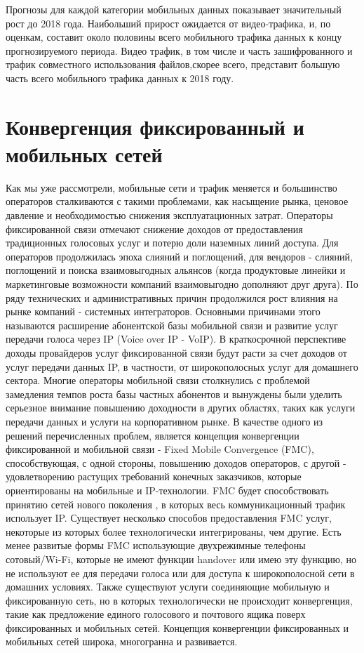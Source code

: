 Прогнозы для каждой категории мобильных данных показывает значительный рост до 2018 года. Наибольший прирост ожидается от видео-трафика, и, по оценкам, составит около половины всего мобильного трафика данных к концу прогнозируемого периода. Видео трафик, в том числе и часть зашифрованного и трафик совместного использования файлов,скорее всего, представит большую часть всего мобильного трафика данных к 2018 году.









\section{Конвергенция фиксированный и мобильных сетей} \label{sect1_1}
Как мы уже рассмотрели, мобильные сети и трафик меняется и большинство операторов сталкиваются с такими проблемами, как насыщение рынка, ценовое давление и необходимостью снижения эксплуатационных затрат. Операторы фиксированной связи отмечают снижение доходов от предоставления традиционных голосовых услуг и потерю доли наземных линий доступа. Для операторов продолжилась эпоха слияний и поглощений, для вендоров - слияний, поглощений и поиска взаимовыгодных альянсов (когда продуктовые линейки и маркетинговые возможности компаний взаимовыгодно дополняют друг друга). По ряду технических и административных причин продолжился рост влияния на рынке компаний - системных интеграторов. Основными причинами этого называются расширение абонентской базы мобильной связи и развитие услуг передачи голоса через IP (Voice over IP - VoIP). В краткосрочной перспективе доходы провайдеров услуг фиксированной связи будут расти за счет доходов от услуг передачи данных IP, в частности, от широкополосных услуг для домашнего сектора.  Многие операторы мобильной связи столкнулись с проблемой замедления темпов роста базы частных абонентов и вынуждены были уделить серьезное внимание повышению доходности в других областях, таких как услуги передачи данных и услуги на корпоративном рынке. В качестве одного из решений перечисленных проблем, является концепция конвергенции фиксированной и мобильной связи - Fixed Mobile Convergence (FMC), способствующая, с одной стороны, повышению доходов операторов, с другой - удовлетворению растущих требований конечных заказчиков, которые ориентированы на мобильные и IP-технологии. FMC будет способствовать принятию сетей нового поколения \cite{FMC}, в которых весь коммуникационный трафик использует IP.
Существует несколько способов предоставления FMC услуг, некоторые из которых более технологически интегрированы, чем другие. Есть менее развитые формы FMC использующие двухрежимные телефоны сотовый/Wi-Fi, которые не имеют функции handover или имею эту функцию, но не используют ее для передачи голоса или для доступа к широкополосной сети в домашних условиях. Также существуют услуги соединяющие мобильную и фиксированную сеть, но в которых технологически не происходит конвергенция, такие как предложение единого голосового и почтового ящика поверх фиксированных и мобильных сетей.
Концепция конвергенции фиксированных и мобильных сетей широка, многогранна и развивается. 


